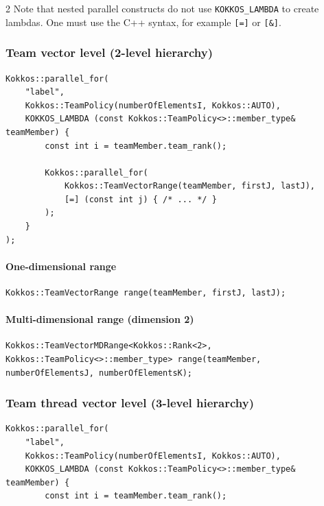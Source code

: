 \documentclass[
    kokkoshighlight,
]{./cheat_sheet_kokkos}
\begin{document}
\begin{multicols}{2}
Note that nested parallel constructs do not use \texttt{KOKKOS_LAMBDA} to create lambdas. One must use the C++ syntax, for example \texttt{[=]} or \texttt{[&]}.

\subsubsection{Team vector level (2-level hierarchy)}

\begin{verbatim}
Kokkos::parallel_for(
    "label",
    Kokkos::TeamPolicy(numberOfElementsI, Kokkos::AUTO),
    KOKKOS_LAMBDA (const Kokkos::TeamPolicy<>::member_type& teamMember) {
        const int i = teamMember.team_rank();

        Kokkos::parallel_for(
            Kokkos::TeamVectorRange(teamMember, firstJ, lastJ),
            [=] (const int j) { /* ... */ }
        );
    }
);
\end{verbatim}

\paragraph{One-dimensional range}

\begin{verbatim}
Kokkos::TeamVectorRange range(teamMember, firstJ, lastJ);
\end{verbatim}

\paragraph{Multi-dimensional range (dimension 2)}

\begin{verbatim}
Kokkos::TeamVectorMDRange<Kokkos::Rank<2>, Kokkos::TeamPolicy<>::member_type> range(teamMember, numberOfElementsJ, numberOfElementsK);
\end{verbatim}

\subsubsection{Team thread vector level (3-level hierarchy)}

\begin{verbatim}
Kokkos::parallel_for(
    "label",
    Kokkos::TeamPolicy(numberOfElementsI, Kokkos::AUTO),
    KOKKOS_LAMBDA (const Kokkos::TeamPolicy<>::member_type& teamMember) {
        const int i = teamMember.team_rank();


\end{verbatim}
\end{multicols}
\end{document}
